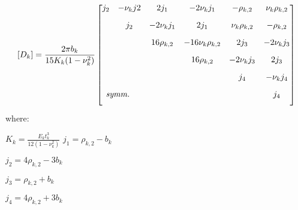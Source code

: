 \begin{equation}\label{eqn:flexMatrix}
  [D_k]=\frac{2\pi b_k}{15K_k(1-\nu_k^2)}
  \begin{bmatrix}
        j_2 & -\nu_kj2 & 2j_1 & -2\nu_kj_1 & -\rho_{k,2} & \nu_k\rho_{k,2} \\[2ex]
            & j_2 & -2\nu_kj_1 & 2j_1 & \nu_k\rho_{k,2} & -\rho_{k,2} \\[2ex]
            &  & 16\rho_{k,2} & -16\nu_k\rho_{k,2} & 2j_3 & -2\nu_kj_3 \\[2ex]
            &  &  & 16\rho_{k,2} & -2\nu_kj_3 & 2j_3 \\[2ex]
            &  &  &  & j_4 & -\nu_kj_4 \\[2ex]
      \rlap{\textit{symm.}} &  &  &  &  & j_4 \\[2ex]
    \end{bmatrix}
\end{equation}
where:\par
$K_k=\frac{E_kt_k^3}{12(1-\nu_k^2)}$
$j_1=\rho_{k,2}-b_k$\par
$j_2=4\rho_{k,2}-3b_k$\par
$j_3=\rho_{k,2}+b_k$\par
$j_4=4\rho_{k,2}+3b_k$\par
\begin{multicols}{2}
\end{multicols}